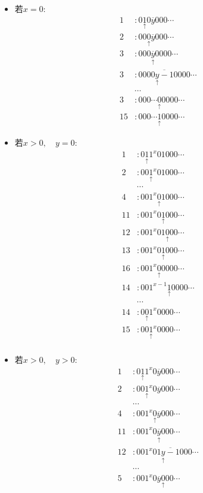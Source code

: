 \documentclass{article}
\newcommand*{\pt}[1]{\ensuremath{\underset{\uparrow}{#1}}}
\begin{document}
\begin{itemize}
	\item 若$x=0$:
	\begin{align*}
		1&:0\pt10\overline y 000\cdots\tag{0R2}\\
		2&:00\pt0\overline y 000\cdots\tag{0R3}\\
		3&:000\pt{\overline y}0000\cdots\tag{0R3}\\
		3&:0000{\overline {\pt y - 1}}0000\cdots\tag{0R3}\\
		&\cdots\tag{0R3}\\
		3&:000\cdots\pt00000\cdots\tag{1O15}\\
		15&:000\cdots\pt10000\cdots\tag{halt}
	\end{align*}
	\item 若$x>0,\quad y=0$:
	\begin{align*}
		1&:0\pt11^x01 000\cdots\tag{0R2}\\
		2&:00\pt1^x01000\cdots\tag{1R4}\\
		&\cdots\tag{1R4}\\
		4&:001^{x}\pt01 000\cdots\tag{0R11}\\
		11&:001^{x}0\pt1 000\cdots\tag{1R12}\\
		12&:001^{x}01 \pt000\cdots\tag{0L13}\\
		13&:001^{x}0\pt1 000\cdots\tag{0L16}\\
		16&:001^{x}\pt00 000\cdots\tag{0L14}\\
		14&:001^{x-1}\pt10 000\cdots\tag{1L14}\\
		&\cdots\tag{1L14}\\
		14&:0\pt01^x0 000\cdots\tag{0R15}\\
		15&:00\pt1^x0 000\cdots\tag{halt}\\
	\end{align*}
	\item 若$x>0,\quad y > 0$:
	\begin{align*}
		1&:0\pt11^x0\overline y 000\cdots\tag{0R2}\\
		2&:00\pt1^x0\overline y 000\cdots\tag{1R4}\\
		&\cdots\tag{1R4}\\
		4&:001^{x}\pt0\overline { y} 000\cdots\tag{0R11}\\
		11&:001^{x}0\overline { \pt y} 000\cdots\tag{1R12}\\
		12&:001^{x}01\overline { \pt y-1} 000\cdots\tag{1R5}\\
		&\cdots\tag{1R5}\\
		5&:001^{x}0\overline {y} \pt000\cdots\tag{0L6}\\

\end{align*}
\end{itemize}
\end{document}
